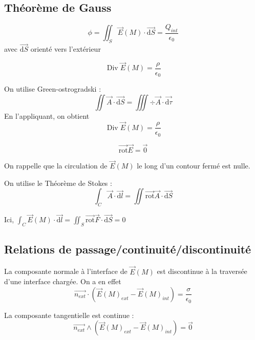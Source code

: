 \documentclass[french]{yLectureNote}
\renewcommand{\vec}{\overrightarrow}
\newcommand{\dd}{\mathrm{d}}
\newcommand{\E}{\vec{E}(M)}
\DeclareMathOperator{\Div}{Div}
\newcommand{\rot}{\vec{\mathrm{rot}}}
\begin{document}
\subsection{Théorème de Gauss} 
\begin{theorem}
    $$\phi = \iint_{S} \E\cdot \vec{\dd S} = \frac{Q_{int}}{\epsilon_0}$$ avec $\vec{\dd S}$ orienté vers l'extérieur
\end{theorem}
\begin{theorem}
    $$\Div\E = \frac{\rho}{\epsilon_0}$$
\end{theorem}
\begin{myproof}
    On utilise Green-ostrogradski :
    $$\iint \vec{A}\cdot \vec{\dd S} = \iiint \div \vec{A}\cdot \vec{\dd \tau}$$
    En l'appliquant, on obtient $$\Div\E = \frac{\rho}{\epsilon_0}$$
\end{myproof}
\begin{theorem}
    $$\rot\vec{E} = \vec{0}$$
\end{theorem}
\begin{myproof}
    On rappelle que la circulation de $\E$ le long d'un contour fermé  est nulle.

On utilise le Théorème de Stokes : $$ \int_C \vec{A}\cdot \vec{\dd l} = \iint \rot \vec{A}\cdot \vec{\dd S}$$

Ici,  $\int_C \E\cdot \vec{\dd l} = \iint_S \rot \vec{F}\cdot \vec{\dd S} = 0$
\end{myproof}
\subsection{Relations de passage/continuité/discontinuité}
\begin{theorem}
La composante normale à l'interface de $\E$ est discontinue à la traversée d'une interface chargée. On a en effet $$\vec{n_{ext}}\cdot (\E_{ext}-\E_{int}) = \frac{\sigma}{\epsilon_0}$$

La composante tangentielle est continue :$$\vec{n_{ext}}\wedge (\E_{ext}-\E_{int}) = \vec{0}$$ 
\end{theorem}
\end{document}
